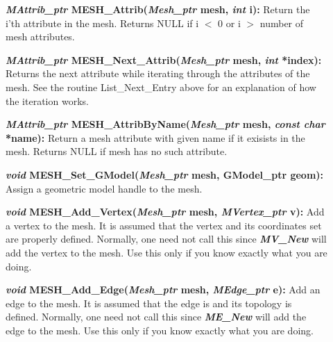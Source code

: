 \documentclass[12pt]{article}
\begin{document}
\begin{description}
\item[]{\bf {\em MAttrib\_ptr} MESH\_Attrib({\em Mesh\_ptr}
    mesh, {\em int} i):} Return the i'th attribute in the mesh.
  Returns NULL if i $<$ 0 or i $>$ number of mesh attributes.
 
\item[]{\bf {\em MAttrib\_ptr}
    MESH\_Next\_Attrib({\em Mesh\_ptr} mesh, {\em int} *index):}
  Returns the next attribute while iterating through the attributes of
  the mesh. See the routine List\_Next\_Entry above for an explanation
  of how the iteration works.
  
\item[]{\bf {\em MAttrib\_ptr}
    MESH\_AttribByName({\em Mesh\_ptr} mesh, {\em const char}
    *name):} Return a mesh attribute with given name if it exisists in
  the mesh. Returns NULL if mesh has no such attribute.

\item[]
  

\item[]{\bf {\em void} MESH\_Set\_GModel({\em Mesh\_ptr} mesh,
GModel\_ptr geom):} Assign a geometric model handle to the mesh.


\item[]

\item[]{\bf {\em void} MESH\_Add\_Vertex({\em Mesh\_ptr}
    mesh, {\em MVertex\_ptr} v):} Add a vertex to the mesh. It is
  assumed that the vertex and its coordinates set are properly
  defined. Normally, one need not call this since
  {\bf {\em MV\_New}} will add the vertex to the mesh. Use this
  only if you know exactly what you are doing.

\item[]{\bf {\em void} MESH\_Add\_Edge({\em Mesh\_ptr} mesh,
    {\em MEdge\_ptr} e):} Add an edge to the mesh. It is assumed
  that the edge is and its topology is defined. Normally, one need not
  call this since {\bf {\em ME\_New}} will add the edge to the
  mesh. Use this only if you know exactly what you are doing.


\end{description}
\end{document}
